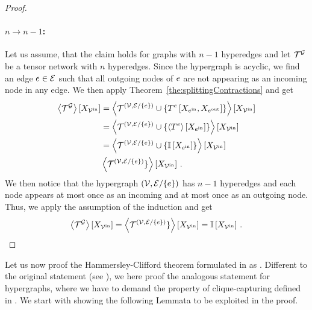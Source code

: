 \begin{proof}
    \paragraph{$n\rightarrow n-1$:} Let us assume, that the claim holds for graphs with $n-1$ hyperedges and let $\mathcal{T}^{\mathcal{G}}$ be a tensor network with $n$ hyperedges.
    Since the hypergraph is acyclic, we find an edge $e\in\mathcal{E}$ such that all outgoing nodes of $e$ are not appearing as an incoming node in any edge.
    We then apply Theorem~\ref{the:splittingContractions} and get
    \begin{align*}
        \left\langle \mathcal{T}^{\mathcal{G}}\right\rangle \left[ X_{\mathcal{V}^{\mathrm{in}}} \right]
        &= \left\langle 
            \mathcal{T}^{(\mathcal{V},\mathcal{E}/\{e\})} \cup \{T^{e}\left[X_{e^{\mathrm{in}}},X_{e^{\mathrm{out}}}\right]\}
        \right\rangle \left[ X_{\mathcal{V}^{\mathrm{in}}} \right] \\
        & = \left\langle 
            \mathcal{T}^{(\mathcal{V},\mathcal{E}/\{e\})} \cup \{\left\langle T^{e}\right\rangle \left[ X_{e^{\mathrm{in}}} \right] \}
        \right\rangle \left[ X_{\mathcal{V}^{\mathrm{in}}} \right] \\
        & = \left\langle 
            \mathcal{T}^{(\mathcal{V},\mathcal{E}/\{e\})} \cup \{\mathbb{I}\left[X_{e^{\mathrm{in}}}\right] \}
        \right\rangle \left[ X_{\mathcal{V}^{\mathrm{in}}} \right] \\
        & \left\langle 
            \mathcal{T}^{(\mathcal{V},\mathcal{E}/\{e\})} \}
        \right\rangle \left[ X_{\mathcal{V}^{\mathrm{in}}} \right] \, .
    \end{align*}
    We then notice that the hypergraph $(\mathcal{V},\mathcal{E}/\{e\})$ has $n-1$ hyperedges and each node appears at most once as an incoming and at most once as an outgoing node.
    Thus, we apply the assumption of the induction and get
    \begin{align*}
        \left\langle \mathcal{T}^{\mathcal{G}}\right\rangle \left[ X_{\mathcal{V}^{\mathrm{in}}} \right] = \left\langle 
            \mathcal{T}^{(\mathcal{V},\mathcal{E}/\{e\})} \}
        \right\rangle \left[ X_{\mathcal{V}^{\mathrm{in}}} \right] = \mathbb{I}\left[X_{\mathcal{V}^{\mathrm{in}}}\right] \, .
    \end{align*}
\end{proof}


\label{sec:proofHCTheorem}

Let us now proof the Hammersley-Clifford theorem formulated in  as .
Different to the original statement (see \cite{clifford_markov_1971}), we here proof the analogous statement for hypergraphs, where we have to demand the property of clique-capturing defined in .
We start with showing the following Lemmata to be exploited in the proof.

